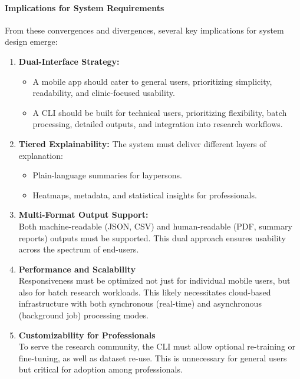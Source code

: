 \documentclass[
  12pt,
  oneside]{article}
\providecommand{\tightlist}{%
  \setlength{\itemsep}{0pt}\setlength{\parskip}{0pt}}
\begin{document}
\paragraph{Implications for System
Requirements}\label{implications-for-system-requirements}

From these convergences and divergences, several key implications for
system design emerge:

\begin{enumerate}
\def\labelenumi{\arabic{enumi}.}
\item
  \textbf{Dual-Interface Strategy:}

  \begin{itemize}
  \tightlist
  \item
    A mobile app should cater to general users, prioritizing simplicity,
    readability, and clinic-focused usability.\\
  \item
    A CLI should be built for technical users, prioritizing flexibility,
    batch processing, detailed outputs, and integration into research
    workflows.
  \end{itemize}
\item
  \textbf{Tiered Explainability:} The system must deliver different
  layers of explanation:

  \begin{itemize}
  \tightlist
  \item
    Plain-language summaries for laypersons.\\
  \item
    Heatmaps, metadata, and statistical insights for professionals.
  \end{itemize}
\item
  \textbf{Multi-Format Output Support:}\\
  Both machine-readable (JSON, CSV) and human-readable (PDF, summary
  reports) outputs must be supported. This dual approach ensures
  usability across the spectrum of end-users.
\item
  \textbf{Performance and Scalability}\\
  Responsiveness must be optimized not just for individual mobile users,
  but also for batch research workloads. This likely necessitates
  cloud-based infrastructure with both synchronous (real-time) and
  asynchronous (background job) processing modes.
\item
  \textbf{Customizability for Professionals}\\
  To serve the research community, the CLI must allow optional
  re-training or fine-tuning, as well as dataset re-use. This is
  unnecessary for general users but critical for adoption among
  professionals.
\end{enumerate}
\end{document}
